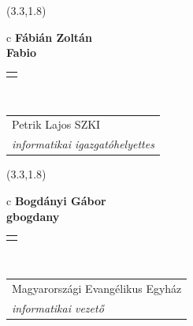 \documentclass[11pt]{article}
\begin{document}
\makebox(3.3,1.8){
  \renewcommand\arraystretch{1.3}
  \begin{tabular}[c]{c}
    \hspace{8.5mm}
    \LARGE\bf{ Fábián Zoltán }\\
    \hspace{8.5mm}
    \Large{ Fabio }\\
    \renewcommand\arraystretch{3}
    \begin{tabular}[c]{c}
      \centering
      \fontfamily{phv}\selectfont{
        \textbf{
          \textsc{
            \scriptsize{
            \color{Bright}{ Ismerkedő }\color{Bright}{ Webmester }\color{Bright}{ Sminkmester }\color{Dark}{ Programozó }
            }
          }
        }
      }
    \end{tabular}
    \\
    \renewcommand\arraystretch{1}
    \begin{tabular}{p{3.3in}}
      \hspace{.7cm}Petrik Lajos SZKI\\
      \hspace{.7cm}\emph{ informatikai igazgatóhelyettes }\\
    \end{tabular}
  \end{tabular}
}

\makebox(3.3,1.8){
  \renewcommand\arraystretch{1.3}
  \begin{tabular}[c]{c}
    \hspace{8.5mm}
    \LARGE\bf{ Bogdányi Gábor }\\
    \hspace{8.5mm}
    \Large{ gbogdany }\\
    \renewcommand\arraystretch{3}
    \begin{tabular}[c]{c}
      \centering
      \fontfamily{phv}\selectfont{
        \textbf{
          \textsc{
            \scriptsize{
            \color{Bright}{ Ismerkedő }\color{Dark}{ Webmester }\color{Bright}{ Sminkmester }\color{Bright}{ Programozó }
            }
          }
        }
      }
    \end{tabular}
    \\
    \renewcommand\arraystretch{1}
    \begin{tabular}{p{3.3in}}
      \hspace{.7cm}Magyarországi Evangélikus Egyház\\
      \hspace{.7cm}\emph{ informatikai vezető }\\
    \end{tabular}
  \end{tabular}
}
\end{document}
